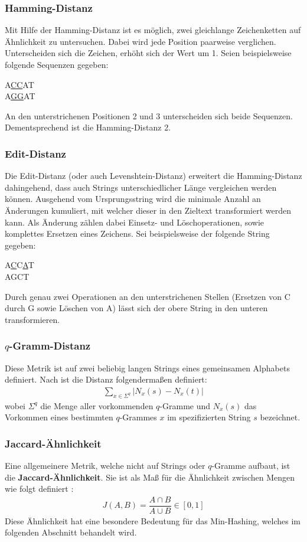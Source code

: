 \subsubsection{Hamming-Distanz}
Mit Hilfe der Hamming-Distanz ist es möglich, zwei gleichlange Zeichenketten auf Ähnlichkeit zu untersuchen.
Dabei wird jede Position paarweise verglichen.
Unterscheiden sich die Zeichen, erhöht sich der Wert um 1.
Seien beispielsweise folgende Sequenzen gegeben:
\begin{center}
	A\underline{CC}AT \\
	A\underline{GG}AT
\end{center}
An den unterstrichenen Positionen 2 und 3 unterscheiden sich beide Sequenzen.
Dementsprechend ist die Hamming-Distanz 2.
\subsubsection{Edit-Distanz}
Die Edit-Distanz (oder auch Levenshtein-Distanz) erweitert die Hamming-Distanz dahingehend, dass auch Strings unterschiedlicher Länge vergleichen werden können.
Ausgehend vom Ursprungsstring wird die minimale Anzahl an Änderungen kumuliert, mit welcher dieser in den Zieltext transformiert werden kann.
Als Änderung zählen dabei Einsetz- und Löschoperationen, sowie komplettes Ersetzen eines Zeichens.
Sei beispielsweise der folgende String gegeben:
\begin{center}
	A\underline{C}C\underline{A}T \\
	AGCT
\end{center}
Durch genau zwei Operationen an den unterstrichenen Stellen (Ersetzen von C durch G sowie Löschen von A) lässt sich der obere String in den unteren transformieren.
\subsubsection{$q$-Gramm-Distanz}
Diese Metrik ist auf zwei beliebig langen Strings eines gemeinsamen Alphabets definiert.
Nach \citet{Rahmann2013} ist die Distanz folgendermaßen definiert:
\begin{align}
	\sum_{x \in \Sigma^q} \vert N_x(s) - N_x(t) \vert
\end{align}
wobei $\Sigma^q$ die Menge aller vorkommenden $q$-Gramme und $N_x(s)$ das Vorkommen eines bestimmten $q$-Grammes $x$ im spezifizierten String $s$ bezeichnet.

\subsubsection{Jaccard-Ähnlichkeit}
Eine allgemeinere Metrik, welche nicht auf Strings oder $q$-Gramme aufbaut, ist die \textbf{Jaccard-Ähnlichkeit}.
Sie ist als Maß für die Ähnlichkeit zwischen Mengen wie folgt definiert \citep{Leskovec2014}:
\begin{align}
	\label{eq:jaccard}
	J(A,B) = \dfrac{A \cap B}{A \cup B} \in [0,1]
\end{align}
Diese Ähnlichkeit hat eine besondere Bedeutung für das Min-Hashing, welches im folgenden Abschnitt behandelt wird.
